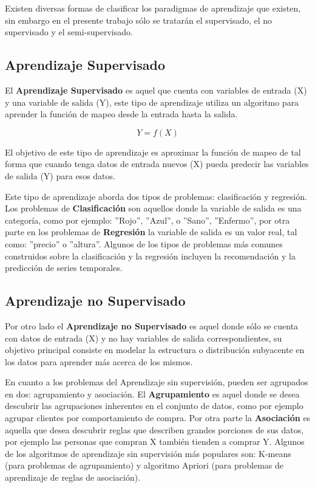 Existen diversas formas de clasificar los paradigmas de aprendizaje que existen, sin embargo en el presente trabajo s\'{o}lo se tratar\'{a}n el supervisado, el no supervisado y el semi-supervisado.

\subsection{Aprendizaje Supervisado}

El \textbf{Aprendizaje Supervisado} es aquel que cuenta con variables de entrada (X) y una variable de salida (Y), este tipo de aprendizaje utiliza un algoritmo para aprender la funci\'{o}n de mapeo desde la entrada hasta la salida.

\begin{equation}
Y = f(X)
\end{equation}

El objetivo de este tipo de aprendizaje es aproximar la funci\'{o}n de mapeo de tal forma que cuando tenga datos de entrada nuevos (X) pueda predecir las variables de salida (Y) para esos datos. 

\vspace{5mm} %

Este tipo de aprendizaje aborda dos tipos de problemas: clasificaci\'{o}n y regresi\'{o}n. Los problemas de \textbf{Clasificaci\'{o}n} son aquellos donde la variable de salida es una categor\'{i}a, como por ejemplo: ''Rojo'', ''Azul'', o ''Sano'', ''Enfermo'', por otra parte en los problemas de \textbf{Regresi\'{o}n} la variable de salida es un valor real, tal como: ''precio'' o ''altura''. Algunos de los tipos de problemas m\'{a}s comunes construidos sobre la clasificaci\'{o}n y la regresi\'{o}n incluyen la recomendaci\'{o}n y la predicci\'{o}n de series temporales.

\subsection{Aprendizaje no Supervisado}

Por otro lado el \textbf{Aprendizaje no Supervisado} es aquel donde s\'{o}lo se cuenta con datos de entrada (X) y no hay variables de salida correspondientes, su objetivo principal consiste en modelar la estructura o distribuci\'{o}n subyacente en los datos para aprender m\'{a}s acerca de los mismos.

\vspace{5mm} %

En cuanto a los problemas del Aprendizaje sin supervisi\'{o}n, pueden ser agrupados en dos: agrupamiento y asociaci\'{o}n. El \textbf{Agrupamiento} es aquel donde se desea descubrir las agrupaciones inherentes en el conjunto de datos, como por ejemplo agrupar clientes por comportamiento de compra. Por otra parte la \textbf{Asociaci\'{o}n} es aquella que desea descubrir reglas que describen grandes porciones de sus datos, por ejemplo las personas que compran X tambi\'{e}n tienden a comprar Y. Algunos de los algoritmos de aprendizaje sin supervisi\'{o}n m\'{a}s populares son: K-means (para problemas de agrupamiento) y algoritmo Apriori (para problemas de aprendizaje de reglas de asociaci\'{o}n).


